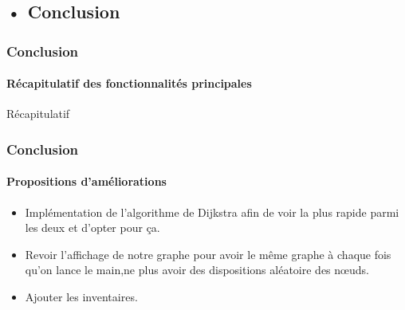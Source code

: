 \documentclass{beamer}
\begin{document}
\begin{frame}
\section{• Conclusion}
\frametitle{Conclusion}
\framesubtitle{Récapitulatif des fonctionnalités principales}
\centering
Récapitulatif 
\end{frame}

\begin{frame}
\frametitle{Conclusion}
\framesubtitle{Propositions d’améliorations}
\begin{itemize}
 \item Implémentation de l'algorithme de Dijkstra afin de voir la plus rapide parmi les deux et d'opter pour ça.
 \item Revoir l'affichage de notre graphe pour avoir le même graphe à chaque fois qu'on lance le main,ne plus avoir des dispositions aléatoire des nœuds.
 \item Ajouter les inventaires.                                             

\end{itemize}
\end{frame}
\end{document}
